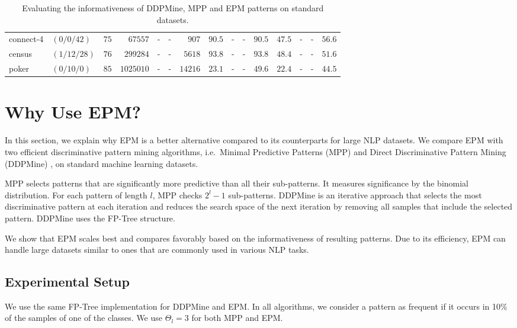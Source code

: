 \begin{table*}[!htb]
\begin{center}
{\begin{tabular}{@{}l||l|r||r||r|r||r|r|r|r|r||r|r|r|r@{}}
  \small connect-4 & $(0/0/42)$ & $75$ & $67557$ & - & - & $907$ & $90.5$ & - & - & $90.5$ & $47.5$ & - & - & $56.6$\\ 
  \small census & $(1/12/28)$ & $76$ & $299284$ & - & - & $5618$& $93.8$ & - & - & $93.8$ & $48.4$ & - & - & $51.6$ \\
  \small poker & $(0/10/0)$ & $85$ & $1025010$ & - & - & $14216$ & $23.1$ & - & - & $49.6$ & $22.4$ & - & - & $44.5$ \\ 
  \end{tabular}
 }
   \caption[Evaluating the informativeness of DDPMine, MPP and EPM patterns]{Evaluating the informativeness of DDPMine, MPP and EPM patterns on standard datasets.}
  \label{tab:performance}
 \end{center}
\end{table*}
\section{Why Use EPM?}
In this section, we explain why EPM is a better alternative compared to its counterparts for large NLP datasets.
We compare EPM with two efficient discriminative pattern mining algorithms, i.e.\
Minimal Predictive Patterns (MPP) \cite{batal10} and Direct Discriminative Pattern Mining (DDPMine) \cite{cheng08},
on standard machine learning datasets.

MPP selects patterns that are significantly more predictive than all their sub-patterns.
It measures significance by the binomial distribution.
For each pattern of length $l$, MPP checks $2^l-1$ sub-patterns.
DDPMine is an iterative approach that selects 
the most discriminative pattern at each iteration and reduces 
the search space of the next iteration by removing all samples that include 
the selected pattern. DDPMine uses the FP-Tree structure.

We show that EPM scales best and compares favorably based on the informativeness of resulting patterns.
Due to its efficiency, EPM can handle large datasets similar 
to ones that are commonly used in various NLP tasks.
%
\subsection{Experimental Setup}
We use the same FP-Tree implementation for DDPMine and EPM.
In all algorithms, we consider a pattern as frequent if it occurs in 10\% of the samples of one of the classes.
We use $\Theta_l=3$ for both MPP and EPM.

